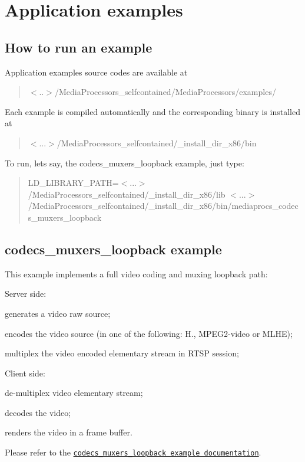 \section*{Application examples }

\subsection*{How to run an example}

Application examples source codes are available at

\begin{quote}
$<$..$>$/\+Media\+Processors\+\_\+selfcontained/\+Media\+Processors/examples/ \end{quote}


Each example is compiled automatically and the corresponding binary is installed at

\begin{quote}
$<$...$>$/\+Media\+Processors\+\_\+selfcontained/\+\_\+install\+\_\+dir\+\_\+x86/bin \end{quote}


To run, let\textquotesingle{}s say, the \textquotesingle{}codecs\+\_\+muxers\+\_\+loopback\textquotesingle{} example, just type\+:

\begin{quote}
L\+D\+\_\+\+L\+I\+B\+R\+A\+R\+Y\+\_\+\+P\+A\+TH=$<$...$>$/\+Media\+Processors\+\_\+selfcontained/\+\_\+install\+\_\+dir\+\_\+x86/lib $<$...$>$/\+Media\+Processors\+\_\+selfcontained/\+\_\+install\+\_\+dir\+\_\+x86/bin/mediaprocs\+\_\+codecs\+\_\+muxers\+\_\+loopback \end{quote}


\subsection*{codecs\+\_\+muxers\+\_\+loopback example}

This example implements a full video coding and muxing loopback path\+:
\begin{DoxyItemize}
\item Server side\+:
\begin{DoxyItemize}
\item generates a video raw source;
\item encodes the video source (in one of the following\+: H., M\+P\+E\+G2-\/video or M\+L\+HE);
\item multiplex the video encoded elementary stream in R\+T\+SP session;
\end{DoxyItemize}
\item Client side\+:
\begin{DoxyItemize}
\item de-\/multiplex video elementary stream;
\item decodes the video;
\item renders the video in a frame buffer.
\end{DoxyItemize}
\end{DoxyItemize}

Please refer to the \href{md_CODECS_MUXERS_LOOPBACK_EXAMPLE.html}{\tt codecs\+\_\+muxers\+\_\+loopback example documentation}. 